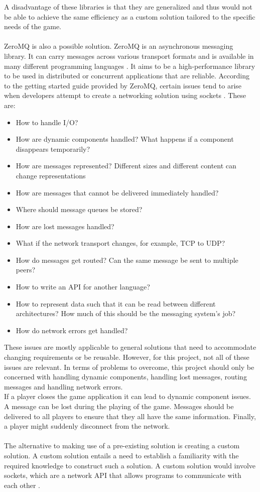 A disadvantage of these libraries is that they are generalized and thus would not be able to achieve the same efficiency as a custom solution tailored to the specific needs of the game.
\\\\
ZeroMQ is also a possible solution.
ZeroMQ is an asynchronous messaging library.
It can carry messages across various transport formats and is available in many different programming languages \cite{zeromqdoc}.
It aims to be a high-performance library to be used in distributed or concurrent applications that are reliable.
According to the getting started guide provided by ZeroMQ, certain issues tend to arise when developers attempt to create a networking solution using sockets \cite{zeromqguide}.
These are:
\begin{itemize}
    \item How to handle I/O?
    \item How are dynamic components handled? What happens if a component disappears temporarily?
    \item How are messages represented? Different sizes and different content can change representations
    \item How are messages that cannot be delivered immediately handled?
    \item Where should message queues be stored?
    \item How are lost messages handled?
    \item What if the network transport changes, for example, TCP to UDP?
    \item How do messages get routed? Can the same message be sent to multiple peers?
    \item How to write an API for another language?
    \item How to represent data such that it can be read between different architectures? How much of this should be the messaging system's job?
    \item How do network errors get handled?
\end{itemize}
These issues are mostly applicable to general solutions that need to accommodate changing requirements or be reusable.
However, for this project, not all of these issues are relevant.
In terms of problems to overcome, this project should only be concerned with handling dynamic components, handling lost messages, routing messages and handling network errors.\\
If a player closes the game application it can lead to dynamic component issues.
A message can be lost during the playing of the game.
Messages should be delivered to all players to ensure that they all have the same information.
Finally, a player might suddenly disconnect from the network.
\\\\
The alternative to making use of a pre-existing solution is creating a custom solution.
A custom solution entails a need to establish a familiarity with the required knowledge to construct such a solution.
A custom solution would involve sockets, which are a network API  that allows programs to communicate with each other \cite{socketnetworking}.

